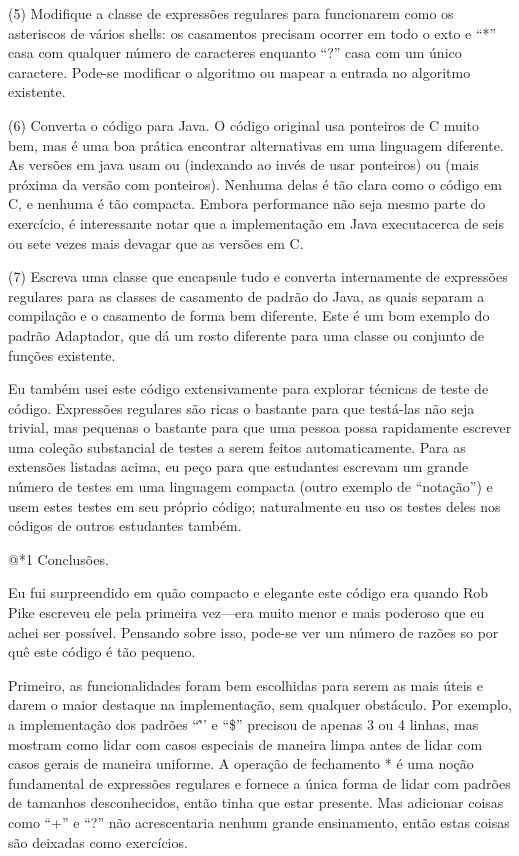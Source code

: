(5) Modifique a classe de expressões regulares para funcionarem como
os asteriscos de vários shells: os casamentos precisam ocorrer em todo
o exto e ``*'' casa com qualquer número de caracteres enquanto ``?''
casa com um único caractere. Pode-se modificar o algoritmo ou mapear a
entrada no algoritmo existente.

(6) Converta o código para Java. O código original usa ponteiros de C
muito bem, mas é uma boa prática encontrar alternativas em uma
linguagem diferente. As versões em java usam ou
 (indexando ao invés de usar ponteiros) ou
 (mais próxima da versão com
ponteiros). Nenhuma delas é tão clara como o código em C, e nenhuma é
tão compacta. Embora performance não seja mesmo parte do exercício, é
interessante notar que a implementação em Java executacerca de seis ou
sete vezes mais devagar que as versões em C.

(7) Escreva uma classe que encapsule tudo e converta internamente de
expressões regulares para as classes de casamento de padrão do Java,
as quais separam a compilação e o casamento de forma bem
diferente. Este é um bom exemplo do padrão Adaptador, que dá um rosto
diferente para uma classe ou conjunto de funções existente.

Eu também usei este código extensivamente para explorar técnicas de
teste de código. Expressões regulares são ricas o bastante para que
testá-las não seja trivial, mas pequenas o bastante para que uma
pessoa possa rapidamente escrever uma coleção substancial de testes a
serem feitos automaticamente. Para as extensões listadas acima, eu
peço para que estudantes escrevam um grande número de testes em uma
linguagem compacta (outro exemplo de ``notação'') e usem estes testes
em seu próprio código; naturalmente eu uso os testes deles nos códigos
de outros estudantes também.

@*1 Conclusões.

Eu fui surpreendido em quão compacto e elegante este código era quando
Rob Pike escreveu ele pela primeira vez---era muito menor e mais
poderoso que eu achei ser possível. Pensando sobre isso, pode-se ver
um número de razões so por quê este código é tão pequeno. 

Primeiro, as funcionalidades foram bem escolhidas para serem as mais
úteis e darem o maior destaque na implementação, sem qualquer
obstáculo. Por exemplo, a implementação dos padrões ``\^'' e ``\$''
precisou de apenas 3 ou 4 linhas, mas mostram como lidar com casos
especiais de maneira limpa antes de lidar com casos gerais de maneira
uniforme. A operação de fechamento * é uma noção fundamental de
expressões regulares e fornece a única forma de lidar com padrões de
tamanhos desconhecidos, então tinha que estar presente. Mas adicionar
coisas como ``+'' e ``?'' não acrescentaria nenhum grande ensinamento,
então estas coisas são deixadas como exercícios.

